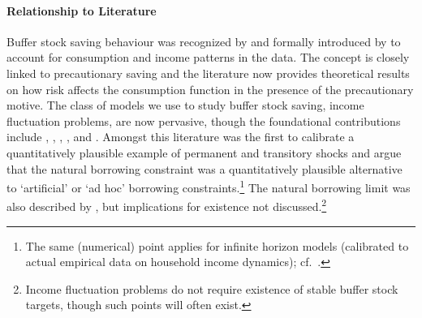 \documentclass[BufferStockTheory]{subfiles}
\begin{document}

\vspace{-1em}

\hypertarget{cfLiterature}{}
\hypertarget{DiffFromLit}{} 
\paragraph{Relationship to Literature}


Buffer stock saving behaviour was recognized by \cite{friedmanATheory} and formally introduced by \cite{carrollBSLCPIH} to account for consumption and income patterns in the data.
The concept is closely linked to precautionary saving \citep{zeldesStochastic, deatonLiqConstr, kimballPrecautionarySaving} and the literature \citep{ckConcavity, lightPrecautionarySaving, chkLiqConstr, maSavingRateRich} now provides theoretical  results on how risk affects the consumption function in the presence of the precautionary motive.
The class of models we use to study buffer stock saving, income fluctuation problems, are now pervasive, though the foundational contributions include \cite{bewleyPIH}, \cite{imrohorogluBusinessCycles}, \cite{zeldesStochastic}, \cite{deatonLiqConstr}, \cite{huggettRiskFreeRate} and \cite{aiyagari:ge}.
Amongst this literature \cite{zeldesStochastic} was the first to calibrate a quantitatively plausible example of permanent and transitory shocks and argue that the natural borrowing constraint was a quantitatively plausible alternative to `artificial' or `ad hoc' borrowing constraints.\footnote{The same (numerical) point applies for infinite horizon models (calibrated to actual empirical data on household income dynamics); cf.~\cite{carrollBrookings}.} The natural borrowing limit was also described by \cite{aiyagari:ge}, but implications for existence not discussed.\footnote{Income fluctuation problems do not require existence of stable buffer stock targets, though such points will often exist.}


% 
\end{document}

